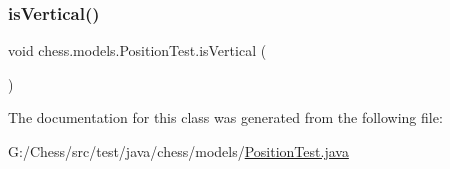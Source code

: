 \mbox{\label{classchess_1_1models_1_1_position_test_aabe6af99895ee105f02d28f723b28df4}} 
\subsubsection{\texorpdfstring{is\+Vertical()}{isVertical()}}
{\footnotesize\ttfamily void chess.\+models.\+Position\+Test.\+is\+Vertical (\begin{DoxyParamCaption}{ }\end{DoxyParamCaption})}



The documentation for this class was generated from the following file\+:\begin{DoxyCompactItemize}
\item 
G\+:/\+Chess/src/test/java/chess/models/\mbox{\hyperlink{_position_test_8java}{Position\+Test.\+java}}\end{DoxyCompactItemize}
